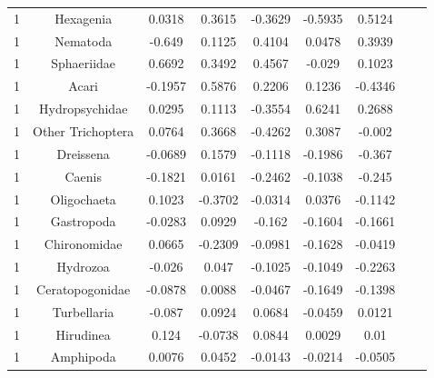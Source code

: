 \begin{table}[htbp]
\begin{tabular}{lcccccccc}
        \midrule
        1 & Hexagenia & 0.0318 & 0.3615 & -0.3629 & -0.5935 & 0.5124 &  &  \\
        1 & Nematoda & -0.649 & 0.1125 & 0.4104 & 0.0478 & 0.3939 &  &  \\
        1 & Sphaeriidae & 0.6692 & 0.3492 & 0.4567 & -0.029 & 0.1023 &  &  \\
        1 & Acari & -0.1957 & 0.5876 & 0.2206 & 0.1236 & -0.4346 &  &  \\
        1 & Hydropsychidae & 0.0295 & 0.1113 & -0.3554 & 0.6241 & 0.2688 &  &  \\
        1 & Other Trichoptera & 0.0764 & 0.3668 & -0.4262 & 0.3087 & -0.002 &  &  \\
        1 & Dreissena & -0.0689 & 0.1579 & -0.1118 & -0.1986 & -0.367 &  &  \\
        1 & Caenis & -0.1821 & 0.0161 & -0.2462 & -0.1038 & -0.245 &  &  \\
        1 & Oligochaeta & 0.1023 & -0.3702 & -0.0314 & 0.0376 & -0.1142 &  &  \\
        1 & Gastropoda & -0.0283 & 0.0929 & -0.162 & -0.1604 & -0.1661 &  &  \\
        1 & Chironomidae & 0.0665 & -0.2309 & -0.0981 & -0.1628 & -0.0419 &  &  \\
        1 & Hydrozoa & -0.026 & 0.047 & -0.1025 & -0.1049 & -0.2263 &  &  \\
        1 & Ceratopogonidae & -0.0878 & 0.0088 & -0.0467 & -0.1649 & -0.1398 &  &  \\
        1 & Turbellaria & -0.087 & 0.0924 & 0.0684 & -0.0459 & 0.0121 &  &  \\
        1 & Hirudinea & 0.124 & -0.0738 & 0.0844 & 0.0029 & 0.01 &  &  \\
        1 & Amphipoda & 0.0076 & 0.0452 & -0.0143 & -0.0214 & -0.0505 &  &  \\
        \bottomrule
    \end{tabular}
\end{table}
